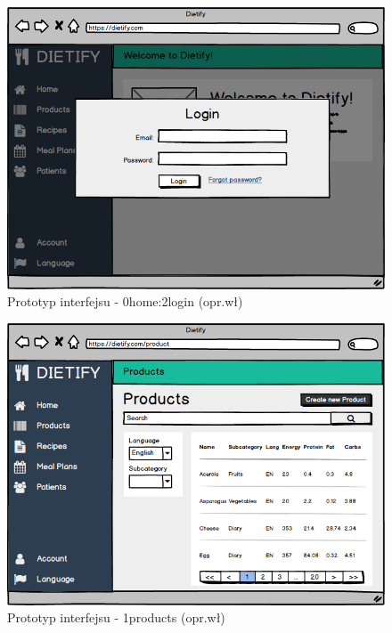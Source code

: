 \begin{minipage}{\textwidth}
    \begin{figure}[H]
        \centering\includegraphics[scale=0.55]{../mockup/0home_2login.png}
        \caption{Prototyp interfejsu - 0home:2login (opr.wł)}\label{rysunek:0home_2login}
    \end{figure}
\end{minipage}
\begin{minipage}{\textwidth}
    \begin{figure}[H]
        \centering\includegraphics[scale=0.55]{../mockup/1products.png}
        \caption{Prototyp interfejsu - 1products (opr.wł)}\label{rysunek:1products}
    \end{figure}
\end{minipage}

